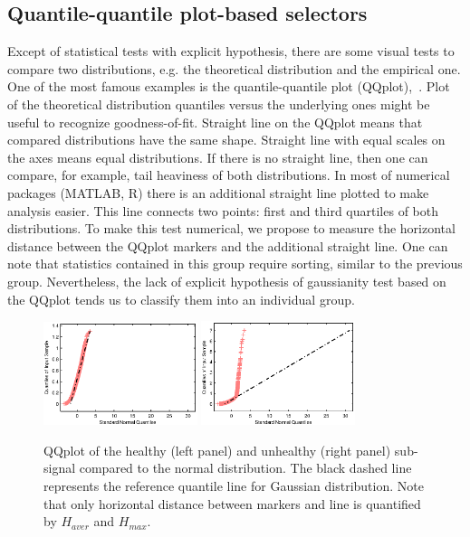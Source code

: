 \subsection{Quantile-quantile plot-based selectors}
Except of statistical tests with explicit hypothesis, there are some visual tests to compare two distributions, e.g. the theoretical distribution and the empirical one. One of the most famous examples is the quantile-quantile plot (QQplot),~\cite{Cleveland1994}. Plot of the theoretical distribution quantiles versus the underlying ones might be useful to recognize goodness-of-fit. Straight line on the QQplot means that compared distributions have the same shape. Straight line with equal scales on the axes means equal distributions. If there is no straight line, then one can compare, for example, tail heaviness of both distributions. In most of numerical packages (MATLAB, R) there is an additional straight line plotted to make analysis easier. This line connects two points: first and third quartiles of both distributions. To make this test numerical, we propose to measure the horizontal distance between the QQplot markers and the additional straight line. One can note that statistics contained in this group require sorting, similar to the previous group. Nevertheless, the lack of explicit hypothesis of gaussianity test based on the QQplot tends us to classify them into an individual group.\\
\begin{figure}[!ht]
\begin{center}
\includegraphics[width=0.4\textwidth]{methodology/selection/fig02aqqplot_g}
\includegraphics[width=0.4\textwidth]{methodology/selection/fig02bqqplot_b}
\caption{QQplot of the healthy (left panel) and unhealthy (right panel) sub-signal compared to the normal distribution. The black dashed line represents the reference quantile line for Gaussian distribution. Note that only horizontal distance between markers and line is quantified by $H_{aver}$ and $H_{max}$.}\label{selection_fig2}
\end{center}
\end{figure}

